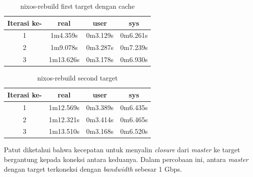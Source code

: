\documentclass[10pt,]{report}
\begin{document}
\begin{adjustwidth}{20pt}{}
\begin{adjustwidth}{20pt}{}
		\begin{table}[H]
			\caption{nixos-rebuild first target dengan cache}
			\begin{center}
				\begin{tabular}[c]{|c|c|c|c|}
					\hline
					\multicolumn{1}{|c|}{\textbf{Iterasi ke-}} &
					\multicolumn{1}{c|}{\textbf{real}}         &
					\multicolumn{1}{c|}{\textbf{user}}         &
					\multicolumn{1}{c|}{\textbf{sys}}                                            \\
					\hline
					1                                          & 1m4.359s  & 0m3.129s & 0m6.261s \\
					\hline
					2                                          & 1m9.078s  & 0m3.287s & 0m7.239s \\
					\hline
					3                                          & 1m13.626s & 0m3.178s & 0m6.930s \\
					\hline
				\end{tabular}
			\end{center}
		\end{table}
		\vspace{-5mm}
		\begin{table}[H]
			\caption{nixos-rebuild second target}
			\begin{center}
				\begin{tabular}[c]{|c|c|c|c|}
					\hline
					\multicolumn{1}{|c|}{\textbf{Iterasi ke-}} &
					\multicolumn{1}{c|}{\textbf{real}}         &
					\multicolumn{1}{c|}{\textbf{user}}         &
					\multicolumn{1}{c|}{\textbf{sys}}                                            \\
					\hline
					1                                          & 1m12.569s & 0m3.389s & 0m6.435s \\
					\hline
					2                                          & 1m12.321s & 0m3.414s & 0m6.465s \\
					\hline
					3                                          & 1m13.510s & 0m3.168s & 0m6.520s \\
					\hline
				\end{tabular}
			\end{center}
		\end{table}
		Patut diketahui bahwa kecepatan untuk menyalin \textit{closure} dari \textit{master}
		ke target bergantung kepada koneksi antara keduanya. Dalam percobaan ini,
		antara \textit{master} dengan target terkoneksi dengan \textit{bandwidth} sebesar
		1 Gbps.
	\end{adjustwidth}

\end{adjustwidth}
\end{document}

